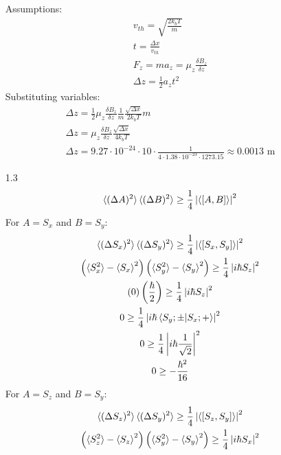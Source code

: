 \documentclass[12pt]{article}
\begin{document}
\begin{enumerate}
        Assumptions:
        \begin{gather*}
            v_{th}=\sqrt{\frac{2k_b T}{m}}\\
            t=\frac{\Delta x}{v_{th}}\\
            F_z=ma_z=\mu_z\frac{\delta B_z}{\delta z}\\
            \Delta z=\frac{1}{2}a_z t^2
        \end{gather*}
        Substituting variables:
        \begin{gather*}
            \Delta z=\frac{1}{2}\mu_z\frac{\delta B_z}{\delta z}\frac{1}{m}\frac{\sqrt{\Delta x}}{2k_b T}m\\
            \Delta z=\mu_z\frac{\delta B_z}{\delta z}\frac{\sqrt{\Delta x}}{4k_b T}\\
            \Delta z=9.27\cdot10^{-24}\cdot10\cdot\frac{1}{4\cdot1.38\cdot10^{-23}\cdot1273.15}\approx0.0013\text{ m}
        \end{gather*}
        \item[1.3]
        \begin{gather*}
            \braket{(\Delta A)^2}\braket{(\Delta B)^2}\geq\frac{1}{4}\left|\braket{\left[A,B\right]}\right|^2
        \end{gather*}
        For $A=S_x$ and $B=S_y$:
        \begin{gather*}
            \braket{(\Delta S_x)^2}\braket{(\Delta S_y)^2}\geq\frac{1}{4}\left|\braket{\left[S_x,S_y\right]}\right|^2\\
            \left(\braket{S_x^2}-\braket{S_x}^2\right)\left(\braket{S_y^2}-\braket{S_y}^2\right)\geq\frac{1}{4}\left|i\hbar S_z\right|^2\\
            \left(0\right)
            \left(\frac{\hbar}{2}\right)
            \geq\frac{1}{4}\left|i\hbar S_z\right|^2\\
            0\geq\frac{1}{4}\left|i\hbar \braket{S_y ;\pm|S_x ;+}\right|^2\\
            0\geq\frac{1}{4}\left|i\hbar \frac{1}{\sqrt{2}}\right|^2\\
            0\geq-\frac{\hbar^2}{16}
        \end{gather*}
        For $A=S_z$ and $B=S_y$:
        \begin{gather*}
            \braket{(\Delta S_z)^2}\braket{(\Delta S_y)^2}\geq\frac{1}{4}\left|\braket{\left[S_z,S_y\right]}\right|^2\\
            \left(\braket{S_z^2}-\braket{S_z}^2\right)\left(\braket{S_y^2}-\braket{S_y}^2\right)\geq\frac{1}{4}\left|i\hbar S_x\right|^2\\

\end{gather*}
\end{enumerate}
\end{document}
